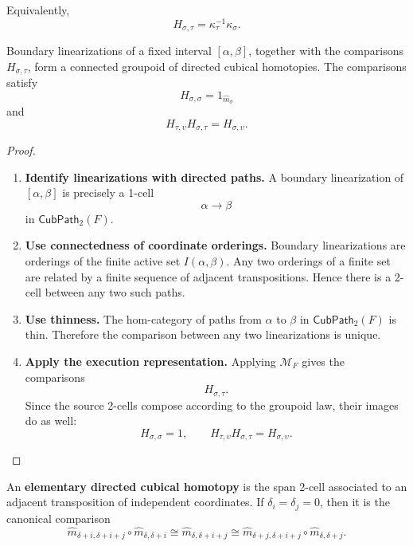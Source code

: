 Equivalently,
\[
    H_{\sigma,\tau}
    =
    \kappa_\tau^{-1}\kappa_\sigma.
\]

\begin{theorem}
\label{thm:cmett-directed-homotopy-boundary-linearizations}
    Boundary linearizations of a fixed interval \([\alpha,\beta]\), together
    with the comparisons \(H_{\sigma,\tau}\), form a connected groupoid of
    directed cubical homotopies. The comparisons satisfy
    \[
        H_{\sigma,\sigma}=1_{\widehat m_\sigma}
    \]
    and
    \[
        H_{\tau,\upsilon}H_{\sigma,\tau}=H_{\sigma,\upsilon}.
    \]
\end{theorem}

\begin{proof}
    \leavevmode
    \begin{enumerate}
        \item \textbf{Identify linearizations with directed paths.}
        A boundary linearization of \([\alpha,\beta]\) is precisely a 1-cell
        \[
            \alpha\to\beta
        \]
        in \(\mathsf{CubPath}_2(F)\).

        \item \textbf{Use connectedness of coordinate orderings.}
        Boundary linearizations are orderings of the finite active set
        \(I(\alpha,\beta)\). Any two orderings of a finite set are related by
        a finite sequence of adjacent transpositions. Hence there is a
        2-cell between any two such paths.

        \item \textbf{Use thinness.}
        The hom-category of paths from \(\alpha\) to \(\beta\) in
        \(\mathsf{CubPath}_2(F)\) is thin. Therefore the comparison between
        any two linearizations is unique.

        \item \textbf{Apply the execution representation.}
        Applying \(\mathcal M_F\) gives the comparisons
        \[
            H_{\sigma,\tau}.
        \]
        Since the source 2-cells compose according to the groupoid law, their
        images do as well:
        \[
            H_{\sigma,\sigma}=1,
            \qquad
            H_{\tau,\upsilon}H_{\sigma,\tau}=H_{\sigma,\upsilon}.
        \]
    \end{enumerate}
\end{proof}

\begin{definition}
\label{def:cmett-elementary-directed-cubical-homotopy}
    An \textbf{elementary directed cubical homotopy} is the span 2-cell
    associated to an adjacent transposition of independent coordinates. If
    \(\delta_i=\delta_j=0\), then it is the canonical comparison
    \[
    \widehat m_{\delta+i,\delta+i+j}
    \circ
    \widehat m_{\delta,\delta+i}
    \cong
    \widehat m_{\delta,\delta+i+j}
    \cong
    \widehat m_{\delta+j,\delta+i+j}
    \circ
    \widehat m_{\delta,\delta+j}.
    \]
\end{definition}

